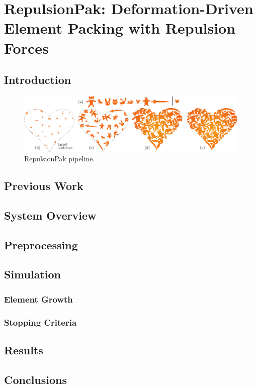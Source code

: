 
\chapter{RepulsionPak: Deformation-Driven Element Packing with Repulsion Forces}



\section{Introduction}

\begin{figure}
\centering
\includegraphics[width=1.0\textwidth]{figures/repulsionpak/pipeline.pdf} 
\caption{\label{fig_repulsionpak_pipeline} 
RepulsionPak pipeline. }
\end{figure}

\section{Previous Work}
\section{System Overview}
\section{Preprocessing}
\section{Simulation}
\subsection{Element Growth}
\subsection{Stopping Criteria}
\section{Results}
\section{Conclusions}